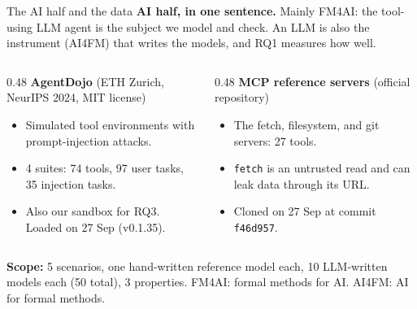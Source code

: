 \documentclass[aspectratio=169,11pt]{beamer}
\newcommand{\act}[1]{\texttt{#1}}
\newcommand{\acro}[1]{\vfill{\color{muted}\scriptsize #1}}
\begin{document}
\begin{frame}{The AI half and the data}
\small
\textbf{AI half, in one sentence.} Mainly FM4AI: the tool-using LLM agent is the subject we model
and check. An LLM is also the instrument (AI4FM) that writes the models, and RQ1 measures how well.

\vspace{0.7em}
\begin{columns}[T,onlytextwidth]
\begin{column}{0.48\textwidth}
\textbf{AgentDojo} (ETH Zurich, NeurIPS 2024, MIT license)
\begin{itemize}\setlength\itemsep{0.1em}
\item Simulated tool environments with prompt-injection attacks.
\item 4 suites: 74 tools, 97 user tasks, 35 injection tasks.
\item Also our sandbox for RQ3. Loaded on 27 Sep (v0.1.35).
\end{itemize}
\end{column}
\begin{column}{0.48\textwidth}
\textbf{MCP reference servers} (official repository)
\begin{itemize}\setlength\itemsep{0.1em}
\item The fetch, filesystem, and git servers: 27 tools.
\item \act{fetch} is an untrusted read and can leak data through its URL.
\item Cloned on 27 Sep at commit \texttt{f46d957}.
\end{itemize}
\end{column}
\end{columns}

\vspace{0.7em}
\textbf{Scope:} 5 scenarios, one hand-written reference model each, 10 LLM-written models each
(50 total), 3 properties.
\acro{FM4AI: formal methods for AI. AI4FM: AI for formal methods.}
\end{frame}
\end{document}
